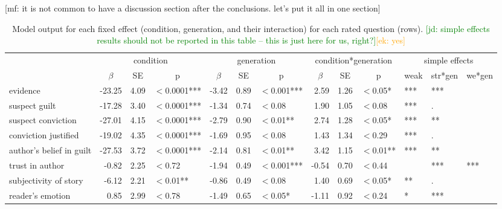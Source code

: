 \documentclass[10pt,letterpaper]{article}
\newcommand{\ek}[1]{\textcolor{Orange}{[ek: #1]}}
\newcommand{\jd}[1]{\textcolor{Green}{[jd: #1]}}
\newcommand{\mf}[1]{\textcolor{PinkyPurple}{[mf: #1]}}
\begin{document}
\mf{it is not common to have a discussion section after the conclusions. let's put it all in one section}



\setlength{\bibleftmargin}{.125in}
\setlength{\bibindent}{-\bibleftmargin}



\begin{table}
	\centering
	\begin{tabular}{l r r l r r l r r l l l l}
		\toprule
		& \multicolumn{3}{c}{condition} & \multicolumn{3}{c}{generation} & \multicolumn{3}{c}{condition*generation} & \multicolumn{3}{c}{simple effects}\\
		& \multicolumn{1}{c}{$\beta$} & \multicolumn{1}{c}{SE} & \multicolumn{1}{c}{p} & \multicolumn{1}{c}{$\beta$} & \multicolumn{1}{c}{SE} & \multicolumn{1}{c}{p} & \multicolumn{1}{c}{$\beta$} & \multicolumn{1}{c}{SE} & \multicolumn{1}{c}{p} & \multicolumn{1}{c}{weak} & \multicolumn{1}{c}{str*gen} & \multicolumn{1}{c}{we*gen}\\
		\midrule
	    evidence    & -23.25 & 4.09 & $<$0.0001*** & -3.42 & 0.89 & $<$0.001*** & 2.59  & 1.26 & $<$0.05*  & *** & *** & \\
		suspect guilt          & -17.28  & 3.40 & $<$0.0001*** & -1.34 & 0.74 & $<$0.08           & 1.90  & 1.05 & $<$0.08 & *** & . & \\
		suspect conviction   & -27.01 & 4.15  & $<$0.0001*** & -2.79 & 0.90 & $<$0.01**     & 2.74  & 1.28 & $<$0.05*  & *** & ** & \\
		conviction justified    & -19.02 & 4.35 & $<$0.0001***  & -1.69 & 0.95 & $<$0.08           & 1.43 & 1.34 & $<$0.29   & *** & . &  \\
		author's belief in guilt     & -27.53 & 3.72 & $<$0.0001***  & -2.14 & 0.81 & $<$0.01**      & 3.42  & 1.15 & $<$0.01** & *** & ** & \\
		trust in author           & -0.82   & 2.25 & $<$0.72           & -1.94 & 0.49 & $<$0.001*** & -0.54 & 0.70 & $<$0.44   & & *** & *** \\
		subjectivity of story  & -6.12   & 2.21 & $<$0.01**          & -0.86 & 0.49 & $<$0.08         & 1.40   & 0.69 & $<$0.05* & ** & . & \\
		reader's emotion & 0.85   & 2.99 & $<$0.78            & -1.49 & 0.65 & $<$0.05*     & -1.11  & 0.92 & $<$0.24  & * & *** & \\
		\bottomrule
	\end{tabular}
	\caption{Model output for each fixed effect (condition, generation, and their interaction) for each rated question (rows). \jd{simple effects results should not be reported in this table -- this is just here for us, right?}\ek{yes}}
	\label{tab:exp2resultsb}
\end{table}
\end{document}
